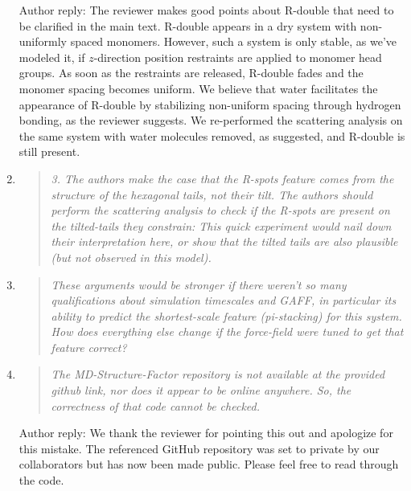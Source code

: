 \documentclass{article}
\begin{document}
\begin{enumerate}
    Author reply: The reviewer makes good points about R-double that need to be clarified in the main text.
    R-double appears in a dry system with non-uniformly spaced monomers. However, such a system is only 
    stable, as we've modeled it, if $z$-direction position restraints are applied to monomer head groups. As
    soon as the restraints are released, R-double fades and the monomer spacing becomes uniform. We believe 
    that water facilitates the appearance of R-double by stabilizing non-uniform spacing through hydrogen bonding,
    as the reviewer suggests. We re-performed the scattering analysis on the same system with water molecules
    removed, as suggested, and R-double is still present.
    
    
	\item \begin{quote}
    \textit{3. The authors make the case that the R-spots feature comes from the structure of the hexagonal
    tails, not their tilt. The authors should perform the scattering analysis to check if the R-spots are
    present on the tilted-tails they constrain: This quick experiment would nail down their interpretation
    here, or show that the tilted tails are also plausible (but not observed in this model).}
    \end{quote}
    
    \item \begin{quote}
    \textit{These arguments would be stronger if there weren't so many qualifications about simulation 
    timescales and GAFF, in particular its ability to predict the shortest-scale feature (pi-stacking) for 
    this system. How does everything else change if the force-field were tuned to get that feature correct?}
    \end{quote}

	\item \begin{quote}
    \textit{The MD-Structure-Factor repository is not available at the provided github link, nor does it appear
    to be online anywhere. So, the correctness of that code cannot be checked.}
	\end{quote}
    
	Author reply: We thank the reviewer for pointing this out and apologize for this mistake. The referenced
	GitHub repository was set to private by our collaborators but has now been made public. Please feel 
	free to read through the code. 
    

\end{enumerate}
\end{document}
